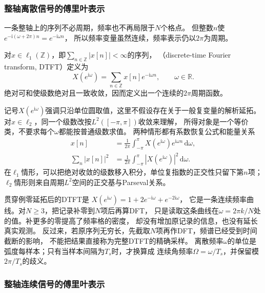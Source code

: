 \subsubsection{整轴离散信号的傅里叶表示}

一条整轴上的序列不必周期，频率也不再局限于$N$个格点。
但整数$n$使$e^{-\mathrm i(\omega+2\pi)n}=e^{-\mathrm i\omega n}$，
所以频率变量虽然连续，频率表示仍以$2\pi$为周期。
\begin{definition}[离散时间傅里叶变换]
  \label{def:signal-analysis-dtft}
  对$x\in\ell_1(\mathbb Z)$，即$\sum_{n\in\mathbb Z}|x[n]|<\infty$的序列，
  （discrete-time Fourier transform, DTFT）定义为
  \begin{equation}
    X(e^{\mathrm i\omega})=\sum_{n\in\mathbb Z}x[n]e^{-\mathrm i\omega n},
    \qquad \omega\in\mathbb R.
    \label{eq:signal-analysis-dtft}
  \end{equation}
  绝对可和使级数绝对且一致收敛，因而定义出一个连续的$2\pi$周期函数。
\end{definition}
记号$X(e^{\mathrm i\omega})$强调只沿单位圆取值，这里不假设存在关于一般复变量的解析延拓。
对$x\in\ell_2$，同一个级数改按$L^2([-\pi,\pi])$收敛来理解，
所得对象是一个等价类，不要求每个$\omega$都能按普通级数求值。
两种情形都有系数恢复公式和能量关系
\begin{align*}
  x[n]&=\frac1{2\pi}\int_{-\pi}^{\pi}
  X(e^{\mathrm i\omega})e^{\mathrm i\omega n}\,\mathrm d\omega,\\
  \sum_n|x[n]|^2&=\frac1{2\pi}\int_{-\pi}^{\pi}|X(e^{\mathrm i\omega})|^2\,\mathrm d\omega.
\end{align*}
在$\ell_1$情形，可以把绝对收敛的级数移入积分，单位复指数的正交性只留下第$n$项；
$\ell_2$情形则来自周期$L^2$空间的正交基与Parseval关系。

贯穿例零延拓后的DTFT是
$X(e^{\mathrm i\omega})=1+2e^{-\mathrm i\omega}+e^{-2\mathrm i\omega}$，
它是一条连续频率曲线。对$N\geq3$，把记录补零到$N$项后再算DFT，
只是读取这条曲线在$\omega=2\pi k/N$处的值。补更多的零提高了频率格的密度，
却没有增加原记录的信息，也没有延长真实观测。
反过来，若原序列无穷长，先截取$N$项再作DFT，频谱已经受到时间截断的影响，
不能把结果直接称为完整DTFT的精确采样。
离散频率$\omega$的单位是弧度每样本；只有当样本间隔为$T_s$时，才换算成
连续角频率$\Omega=\omega/T_s$，并保留模$2\pi/T_s$的歧义。

\subsubsection{整轴连续信号的傅里叶表示}

